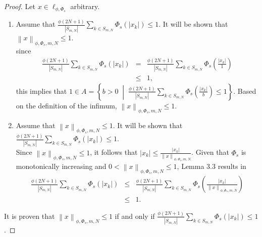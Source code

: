 \documentclass[12pt,a4paper]{article}
\theoremstyle{remark}
\begin{document}
\begin{proof} Let $x\in\ell_{\phi,\Phi_s}$ arbitrary.
    \begin{enumerate}
        \item [$(\Leftarrow)$] Assume that $\frac{\phi\left(2N+1\right)}{\left|S_{m,N}\right|} \sum_{k \in S_{m,N}} \Phi_s\left(\left|x_k\right|\right) \leq 1$. It will be shown that $\left\lVert x \right\rVert_{\phi, \Phi_s, m, N} \leq 1$.\\
        since
        \begin{eqnarray*}
            \frac{\phi\left(2N+1\right)}{\left|S_{m,N}\right|} \sum_{k \in S_{m,N}} \Phi_s\left(\left|x_k\right|\right) &=&\frac{\phi\left(2N+1\right)}{\left|S_{m,N}\right|} \sum_{k \in S_{m,N}} \Phi_s\left(\frac{\left|x_k\right|}{1}\right)\\
            &\leq& 1,
        \end{eqnarray*}
        this implies that $1 \in A = \left\{b>0 \;\middle|\; \frac{\phi\left(2N+1\right)}{\left|S_{m,N}\right|}\sum_{k\in S_{m,N}}\Phi_s\left(\frac{\left|x_k\right|}{b}\right) \leq 1\right\}$. Based on the definition of the infimum, $\left\lVert x \right\rVert_{\phi, \Phi_s, m, N} \leq 1$.
        \item[($\Rightarrow$)] Assume that $\left\lVert x \right\rVert_{\phi, \Phi_s, m, N} \leq 1$. It will be shown that $\frac{\phi\left(2N+1\right)}{\left|S_{m,N}\right|}\sum_{k \in S_{m,N}} \Phi_s\left(\left|x_k\right|\right) \leq 1$.\\
        Since $\left\lVert x \right\rVert_{\phi, \Phi_s, m, N} \leq 1$, it follows that $\left|x_k\right| \leq \frac{\left|x_k\right|}{\left\lVert x \right\rVert_{\phi, \Phi_s, m, N}}$. Given that $\Phi_s$ is monotonically increasing and $0 < \left\lVert x \right\rVert_{\phi, \Phi_s, m, N} \leq 1$, Lemma 3.3 results in
        \begin{eqnarray*}
            \frac{\phi\left(2N+1\right)}{\left|S_{m,N}\right|} \sum_{k \in S_{m,N}} \Phi_s\left(\left|x_k\right|\right) &\leq& \frac{\phi\left(2N+1\right)}{\left|S_{m,N}\right|} \sum_{k \in S_{m,N}} \Phi_s\left(\frac{\left|x_k\right|}{\left\lVert x \right\rVert_{\phi, \Phi_s, m, N}}\right)\\
            &\leq& 1.
        \end{eqnarray*}
    \end{enumerate}
    It is proven that $\left\lVert x \right\rVert_{\phi, \Phi_s, m, N} \leq 1$ if and only if $\frac{\phi\left(2N+1\right)}{\left|S_{m,N}\right|} \sum_{k \in S_{m,N}} \Phi_s\left(\left|x_k\right|\right) \leq 1$.
\end{proof}
\end{document}
